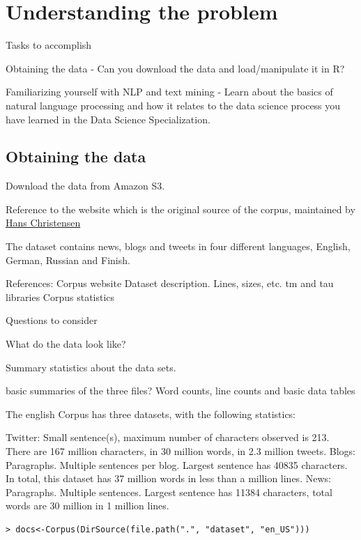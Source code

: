 \documentclass{article}
\begin{document}



\section{Understanding the problem}

Tasks to accomplish

Obtaining the data - Can you download the data and load/manipulate it in R?

Familiarizing yourself with NLP and text mining - Learn about the basics of natural language processing and how it relates to the data science process you have learned in the Data Science Specialization.

\subsection{Obtaining the data}

Download the data from Amazon S3.

Reference to the website which is the original source of the corpus, maintained by \href{http://www.corpora.heliohost.org}{Hans Christensen}

The dataset contains news, blogs and tweets in four different languages, English, German, Russian and Finish.


References:
Corpus website
Dataset description. Lines, sizes, etc.
tm and tau libraries
Corpus statistics



Questions to consider

What do the data look like?

Summary statistics about the data sets.

basic summaries of the three files? Word counts, line counts and basic data tables

The english Corpus has three datasets, with the following statistics:

Twitter: Small sentence(s), maximum number of characters observed is 213. There are 167 million characters, in 30 million words, in 2.3 million tweets.
Blogs: Paragraphs. Multiple sentences per blog. Largest sentence has 40835 characters. In total, this dataset has 37 million words in less than a million lines.
News: Paragraphs. Multiple sentences. Largest sentence has 11384 characters, total words are 30 million in 1 million lines.

\begin{lstlisting}
> docs<-Corpus(DirSource(file.path(".", "dataset", "en_US")))

\end{lstlisting}
\end{document}

